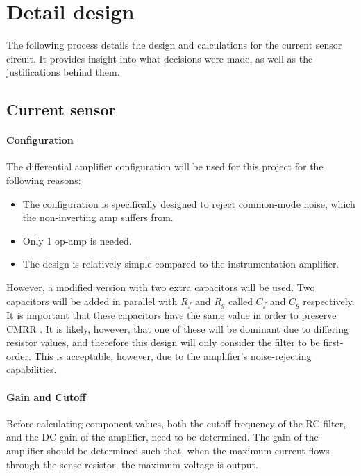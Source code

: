 \chapter{Detail design}\label{ch:detail_design}
The following process details the design and calculations for the current sensor circuit. It provides insight into
what decisions were made, as well as the justifications behind them.

\section{Current sensor}\label{sec:current_sensor_design}
\subsubsection{Configuration}\label{sec:current_sensor_config}

The differential amplifier configuration will be used for this project for the following reasons:
\begin{itemize}
  \item The configuration is specifically designed to reject common-mode noise, which the non-inverting amp suffers from.
  \item Only 1 op-amp is needed.
  \item The design is relatively simple compared to the instrumentation amplifier.
\end{itemize}

However, a modified version with two extra capacitors will be used. Two capacitors will be added in parallel with $R_f$ and $R_g$ called $C_f$ and $C_g$ respectively. It is important that these capacitors have the same
value in order to preserve CMRR \cite{WebsiteOpAmpConfigurations}. It is likely, however, that one of these will be dominant due to differing resistor values, and therefore this design will only consider the filter to be first-order.
This is acceptable, however, due to the amplifier's noise-rejecting capabilities.

\subsubsection{Gain and Cutoff}\label{sec:current_sensor_circuit}
Before calculating component values, both the cutoff frequency of the RC filter, and the DC gain of the amplifier, need to be determined. The gain of the amplifier should be determined
such that, when the maximum current flows through the sense resistor, the maximum voltage is output.

